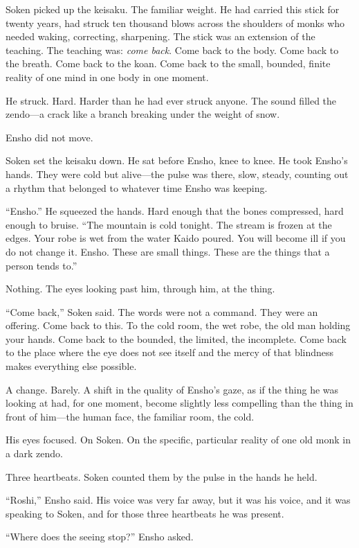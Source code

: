 Soken picked up the keisaku. The familiar weight. He had carried this stick for twenty years, had struck ten thousand blows across the shoulders of monks who needed waking, correcting, sharpening. The stick was an extension of the teaching. The teaching was: \emph{come back}. Come back to the body. Come back to the breath. Come back to the koan. Come back to the small, bounded, finite reality of one mind in one body in one moment.

He struck. Hard. Harder than he had ever struck anyone. The sound filled the zendo---a crack like a branch breaking under the weight of snow.

Ensho did not move.

Soken set the keisaku down. He sat before Ensho, knee to knee. He took Ensho's hands. They were cold but alive---the pulse was there, slow, steady, counting out a rhythm that belonged to whatever time Ensho was keeping.

``Ensho.'' He squeezed the hands. Hard enough that the bones compressed, hard enough to bruise. ``The mountain is cold tonight. The stream is frozen at the edges. Your robe is wet from the water Kaido poured. You will become ill if you do not change it. Ensho. These are small things. These are the things that a person tends to.''

Nothing. The eyes looking past him, through him, at the thing.

``Come back,'' Soken said. The words were not a command. They were an offering. Come back to this. To the cold room, the wet robe, the old man holding your hands. Come back to the bounded, the limited, the incomplete. Come back to the place where the eye does not see itself and the mercy of that blindness makes everything else possible.

A change. Barely. A shift in the quality of Ensho's gaze, as if the thing he was looking at had, for one moment, become slightly less compelling than the thing in front of him---the human face, the familiar room, the cold.

His eyes focused. On Soken. On the specific, particular reality of one old monk in a dark zendo.

Three heartbeats. Soken counted them by the pulse in the hands he held.

``Roshi,'' Ensho said. His voice was very far away, but it was his voice, and it was speaking to Soken, and for those three heartbeats he was present.

``Where does the seeing stop?'' Ensho asked.

